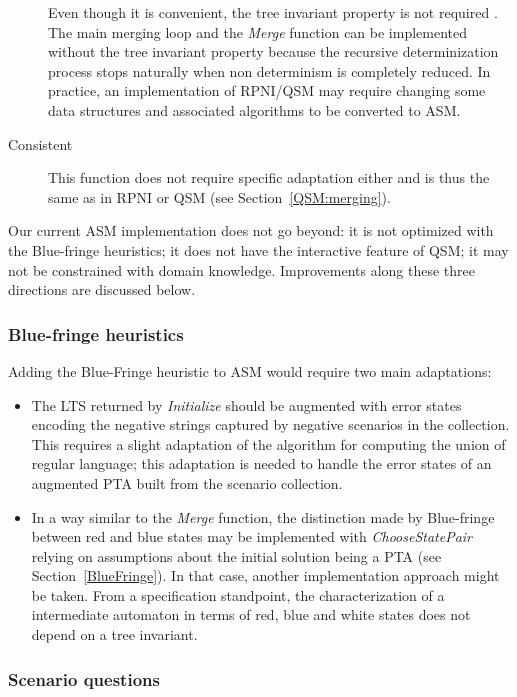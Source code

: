 \begin{description}
Even though it is convenient, the tree invariant property is not required \cite{Lambeau:2008}. The main merging loop and the \emph{Merge} function can be implemented without the tree invariant property because the recursive determinization process stops naturally when non determinism is completely reduced. In practice, an implementation of RPNI/QSM may require changing some data structures and associated algorithms to be converted to ASM.

\item[Consistent] This function does not require specific adaptation either and is thus the same as in RPNI or QSM (see Section~\ref{QSM:merging}).

\end{description}

Our current ASM implementation does not go beyond: it is not optimized with the Blue-fringe heuristics; it does not have the interactive feature of QSM; it may not be constrained with domain knowledge. Improvements along these three directions are discussed below.

\subsubsection*{Blue-fringe heuristics}

Adding the Blue-Fringe heuristic to ASM would require two main adaptations: 
\begin{itemize}
\item The LTS returned by \emph{Initialize} should be augmented with error states encoding the negative strings captured by negative scenarios in the collection. This requires a slight adaptation of the algorithm for computing the union of regular language; this adaptation is needed to handle the error states of an augmented PTA built from the scenario collection.
\item In a way similar to the \emph{Merge} function, the distinction made by Blue-fringe between red and blue states may be implemented with \emph{ChooseStatePair} relying on assumptions about the initial solution being a PTA (see Section~\ref{BlueFringe}). In that case, another implementation approach might be taken. From a specification standpoint, the characterization of a intermediate automaton in terms of red, blue and white states does not depend on a tree invariant.
\end{itemize}

\subsubsection*{Scenario questions}

